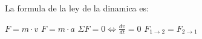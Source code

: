 
\question La formula de la ley de la dinamica es:

  \begin{oneparchoices}
    \choice $F=m \cdot v$
    \CorrectChoice $F=m \cdot a$
    \choice $\Sigma F = 0 \Leftrightarrow \frac{dv}{dt} = 0$
    \choice $F_{1 \rightarrow 2} = F_{2 \rightarrow 1}$
  \end{oneparchoices}
  \answerline[B]
